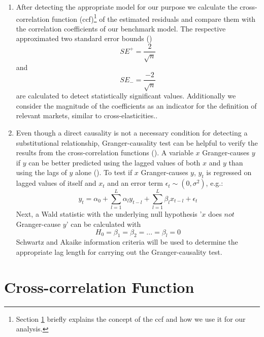 \documentclass[10pt,a4paper]{scrreprt}
\begin{document}
\begin{enumerate}
\begin{enumerate}
	\end{enumerate}
	\item After detecting the appropriate model for our purpose we calculate the cross-correlation function (ccf)\footnote{Section \ref{sec:ccf} briefly explains the concept of the ccf and how we use it for our analysis.} of the estimated residuals and compare them with the correlation coefficients of our benchmark model. The respective approximated two standard error bounds (\cite{tiao_modeling_1981}) \begin{equation}
		SE^+=\frac{2}{\sqrt{n}}
	\end{equation} and  \begin{equation}
		SE_-=\frac{-2}{\sqrt{n}}
	\end{equation} are calculated to detect statistically significant values. Additionally we consider the magnitude of the coefficients as an indicator for the definition of relevant markets, similar to cross-elasticities.\cite[562]{stigler_extent_1985}.   
	\item Even though a direct causality is not a necessary condition for detecting a substitutional relationship, Granger-causality test can be helpful to verify the results from the cross-correlation functions (\cite{dewenter_essays_2004}). A variable $x$ Granger-causes $y$ if $y$ can be better predicted using the lagged values of both $x$ and $y$ than using the lags of $y$ alone (\cite{granger_investigating_1969}). To test if $x$ Granger-causes $y$, $y_t$ is regressed on lagged values of itself and $x_t$ and an error term $\epsilon_t\sim(0,\sigma^2)$, e.g.: \begin{equation}
		y_t=\alpha_0+\sum_{l=1}^L\alpha_ly_{t-l}+\sum_{l=1}^L\beta_lx_{t-l}+\epsilon_t
	    \end{equation}
	    Next, a Wald statistic with the underlying null hypothesis '$x$ does $not$ Granger-cause $y$' can be calculated with \begin{equation}
	    	H_0=\beta_1=\beta_2=...=\beta_l=0
	    \end{equation}
	    Schwartz and Akaike information criteria will be used to determine the appropriate lag length for carrying out the Granger-causality test.
	    
\end{enumerate} 

\section{Cross-correlation Function}\label{sec:ccf}
\end{document}

